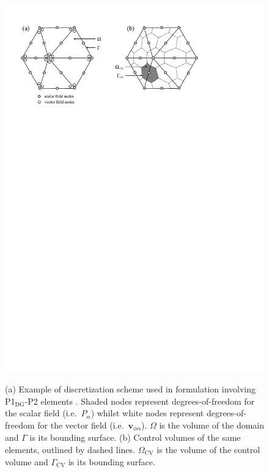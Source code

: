 \begin{figure}[h]
\vbox{
\hbox{\hspace{1cm}
  \includegraphics[width=15.0cm,height=19.cm]{./doc_figures/discretization}}
\vspace{-14cm}}
    \caption[]{(a) Example of discretization scheme used in formulation involving P1$_\mathrm{DG}$-P2 elements \cite{cotter_2007}.  Shaded nodes represent degrees-of-freedom for the scalar field (i.e.\ $P_\alpha$) whilst white nodes represent degrees-of-freedom for the vector field (i.e.\ $\mathbf{v}_{\phi \alpha}$).  $\Omega$ is the volume of the domain and $\Gamma$ is its bounding surface.  (b) Control volumes of the same elements, outlined by dashed lines.  $\Omega_\mathrm{CV}$ is the volume of the control volume and $\Gamma_\mathrm{CV}$ is its bounding surface.\label{f:discretization}}
\end{figure}

